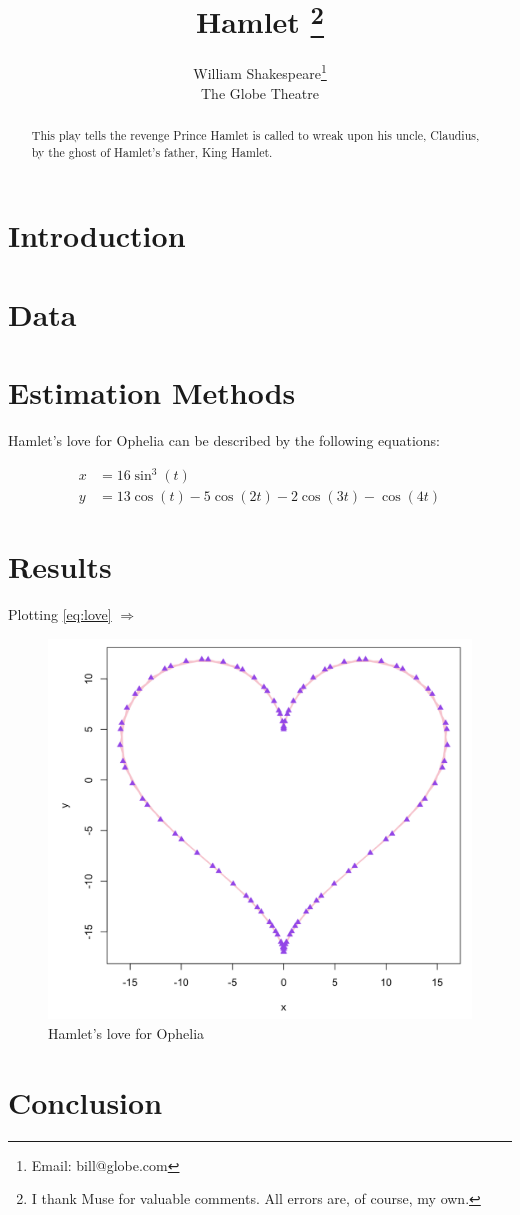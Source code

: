 \documentclass[12pt]{article}
\begin{document}
\title{Hamlet \thanks{I thank Muse for valuable comments. All errors are, of course, my
own.}}
\author{William Shakespeare\thanks{Email: bill@globe.com }\\
The Globe Theatre }
\maketitle
\begin{abstract}
This play tells the revenge Prince Hamlet is called to wreak upon
his uncle, Claudius, by the ghost of Hamlet's father, King Hamlet.
\end{abstract}

\section{Introduction}

\section{Data}

\section{Estimation Methods}

Hamlet's love for Ophelia can be described by the following equations:

\begin{align}
x & =16\sin^{3}\left(t\right)\label{eq:love}\\
y & =13\cos\left(t\right)-5\cos\left(2t\right)-2\cos\left(3t\right)-\cos\left(4t\right)\nonumber 
\end{align}

\pagebreak{}

\section{Results}

Plotting \eqref{eq:love} $\Rightarrow$
\begin{figure}[H]
\includegraphics[scale=0.5]{love}

\caption{Hamlet's love for Ophelia}

\end{figure}


\section{Conclusion}
\end{document}
